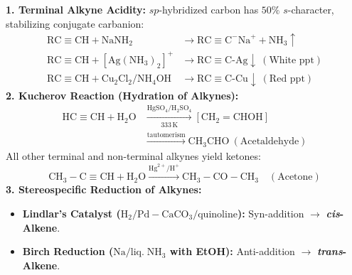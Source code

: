 \documentclass[10pt,twoside,openright]{book}
\begin{document}
\begin{formulabox}
\textbf{1. Terminal Alkyne Acidity:} $sp$-hybridized carbon has $50\%$ $s$-character, stabilizing conjugate carbanion:
\begin{align*}
  \mathrm{RC\equiv CH} + \mathrm{NaNH_2} &\longrightarrow \mathrm{RC\equiv C}^-\mathrm{Na}^+ + \mathrm{NH}_3 \uparrow\\
  \mathrm{RC\equiv CH} + [\mathrm{Ag(NH_3)_2}]^+ &\longrightarrow \mathrm{RC\equiv C\text{-}Ag}\downarrow \ (\text{White ppt})\\
  \mathrm{RC\equiv CH} + \mathrm{Cu_2Cl_2/NH_4OH} &\longrightarrow \mathrm{RC\equiv C\text{-}Cu}\downarrow \ (\text{Red ppt})
\end{align*}
\textbf{2. Kucherov Reaction (Hydration of Alkynes):}
\begin{align*}
  \mathrm{HC\equiv CH} + \mathrm{H_2O} &\xrightarrow[333\,\mathrm{K}]{\mathrm{HgSO_4/H_2SO_4}} [\mathrm{CH_2=CHOH}] \\
  &\xrightarrow{\text{tautomerism}} \mathrm{CH_3CHO} \ (\text{Acetaldehyde})
\end{align*}
All other terminal and non-terminal alkynes yield ketones:
\begin{equation}
  \mathrm{CH_3-C\equiv CH} + \mathrm{H_2O} \xrightarrow{\mathrm{Hg}^{2+} / \mathrm{H}^+} \mathrm{CH_3-CO-CH_3} \quad (\text{Acetone})
\end{equation}
\textbf{3. Stereospecific Reduction of Alkynes:}
\begin{itemize}
  \item \textbf{Lindlar's Catalyst ($\mathrm{H_2 / Pd-CaCO_3 / quinoline}$):} Syn-addition $\to$ \textbf{\textit{cis}-Alkene}.
  \item \textbf{Birch Reduction ($\mathrm{Na / liq.\; NH_3}$ with EtOH):} Anti-addition $\to$ \textbf{\textit{trans}-Alkene}.
\end{itemize}
\end{formulabox}
\end{document}
